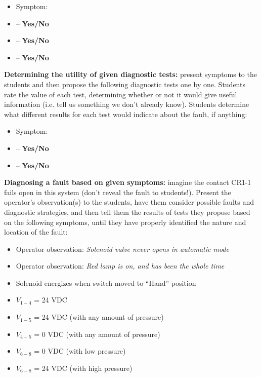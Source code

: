 \begin{itemize}
\item{} Symptom: {\it }
\item{}  -- {\bf Yes/No}
\item{}  -- {\bf Yes/No}
\item{}  -- {\bf Yes/No}
\end{itemize}


\vskip 10pt


\noindent
{\bf Determining the utility of given diagnostic tests:} present symptoms to the students and then propose the following diagnostic tests one by one.  Students rate the value of each test, determining whether or not it would give useful information (i.e. tell us something we don't already know).  Students determine what different results for each test would indicate about the fault, if anything:

\begin{itemize}
\item{} Symptom: {\it }
\item{}  -- {\bf Yes/No}
\item{}  -- {\bf Yes/No}
\end{itemize}


\vskip 10pt


\noindent
{\bf Diagnosing a fault based on given symptoms:} imagine the contact CR1-1 fails open in this system (don't reveal the fault to students!).  Present the operator's observation(s) to the students, have them consider possible faults and diagnostic strategies, and then tell them the results of tests they propose based on the following symptoms, until they have properly identified the nature and location of the fault:

\begin{itemize}
\item{} Operator observation: {\it Solenoid valve never opens in automatic mode}
\item{} Operator observation: {\it Red lamp is on, and has been the whole time}
\item{} Solenoid energizes when switch moved to ``Hand'' position
\item{} $V_{1-4}$ = 24 VDC
\item{} $V_{1-5}$ = 24 VDC (with any amount of pressure)
\item{} $V_{4-5}$ = 0 VDC (with any amount of pressure)
\item{} $V_{6-8}$ = 0 VDC (with low pressure)
\item{} $V_{6-8}$ = 24 VDC (with high pressure)
\end{itemize}




